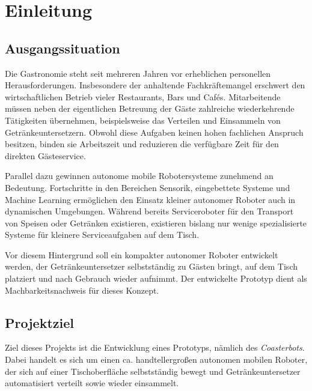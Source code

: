 \documentclass[
  a4paper,
  12pt,
  DIV=12,        %
  parskip=half,  %
  headings=small %
]{scrartcl}
\theoremstyle{definition}
\theoremstyle{definition}
\begin{document}
\newpage

\tableofcontents

\newpage

\section{Einleitung}\label{einleitung}

\subsection{Ausgangssituation}\label{ausgangssituation}

Die Gastronomie steht seit mehreren Jahren vor erheblichen personellen
Herausforderungen. Insbesondere der anhaltende Fachkräftemangel
erschwert den wirtschaftlichen Betrieb vieler Restaurants, Bars und
Cafés. Mitarbeitende müssen neben der eigentlichen Betreuung der Gäste
zahlreiche wiederkehrende Tätigkeiten übernehmen, beispielsweise das
Verteilen und Einsammeln von Getränkeuntersetzern. Obwohl diese Aufgaben
keinen hohen fachlichen Anspruch besitzen, binden sie Arbeitszeit und
reduzieren die verfügbare Zeit für den direkten Gästeservice.

Parallel dazu gewinnen autonome mobile Robotersysteme zunehmend an
Bedeutung. Fortschritte in den Bereichen Sensorik, eingebettete Systeme
und Machine Learning ermöglichen den Einsatz kleiner autonomer Roboter
auch in dynamischen Umgebungen. Während bereits Serviceroboter für den
Transport von Speisen oder Getränken existieren, existieren bislang nur
wenige spezialisierte Systeme für kleinere Serviceaufgaben auf dem
Tisch.

Vor diesem Hintergrund soll ein kompakter autonomer Roboter entwickelt
werden, der Getränkeuntersetzer selbstständig zu Gästen bringt, auf dem
Tisch platziert und nach Gebrauch wieder aufnimmt. Der entwickelte
Prototyp dient als Machbarkeitsnachweis für dieses Konzept.

\subsection{Projektziel}\label{projektziel}

Ziel dieses Projekts ist die Entwicklung eines Prototyps, nämlich des
\emph{Coasterbots}. Dabei handelt es sich um einen ca. handtellergroßen
autonomen mobilen Roboter, der sich auf einer Tischoberfläche
selbstständig bewegt und Getränkeuntersetzer automatisiert verteilt
sowie wieder einsammelt.
\end{document}
